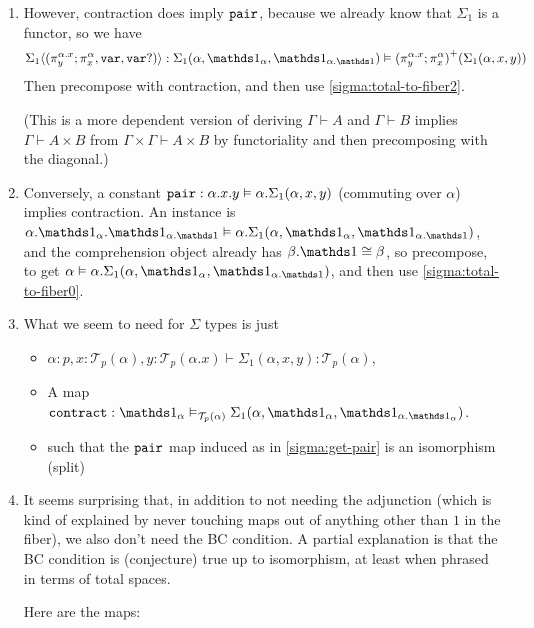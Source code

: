 \documentclass[10pt]{article}
\theoremstyle{definition}
\newcommand\TrPlus[2]{\ensuremath{{#1}^+(#2)}}
\newcommand\El[2]{\mathcal{T}_{#1}(#2)}
\newcommand\ap[2]{\ensuremath{#1 \langle #2 \rangle }}
\begin{document}
\begin{enumerate}
\item \label{sigma:get-pair} However, contraction does imply
  $\mathtt{pair}$, because we already know that $\Sigma_1$ is a functor, so
  we have
  \[
  \ap{\Sigma_1}{(\pi^{\alpha.x}_y;\pi^\alpha_x, \mtt{var}, \mtt{var}?)} :
  \Sigma_1(\alpha,\One_\alpha,\One_{\alpha.\One}) \vDash \TrPlus{(\pi^{\alpha.x}_y;\pi^\alpha_x)}{\Sigma_1(\alpha,x,y)}
  \]
  Then precompose with contraction, and then use
  \ref{sigma:total-to-fiber2}.

  (This is a more dependent version of deriving $\Gamma \vdash A$ and
  $\Gamma \vdash B$ implies $\Gamma \vdash A \times B$ from $\Gamma
  \times \Gamma \vdash A \times B$ by functoriality and then
  precomposing with the diagonal.)
  
\item Conversely, a constant $\mathtt{pair} : \alpha.x.y \vDash
  \alpha.\Sigma_1(\alpha,x,y)$ (commuting over $\alpha$) implies
  contraction. An instance is $\alpha.\One_{\alpha}.\One_{\alpha.\One} \vDash
  \alpha.\Sigma_1(\alpha,\One_\alpha,\One_{\alpha.\One})$, and the comprehension
  object already has $\beta.\One \cong \beta$, so precompose, to get
  $\alpha \vDash \alpha.\Sigma_1(\alpha,\One_\alpha,\One_{\alpha.\One})$, and
  then use \ref{sigma:total-to-fiber0}.

\item \label{sigma:spec} What we seem to need for $\Sigma$ types is just
  \begin{itemize}
  \item $\alpha : p, x : \El{p}{\alpha}, y : \El{p}{\alpha.x} \vdash \Sigma_1(\alpha,x,y) : \El{p}{\alpha}$,
  \item A map $\mtt{contract} : \One_\alpha \vDash_{\El{p}{\alpha}} \Sigma_1(\alpha,\One_\alpha,\One_{\alpha.{\One_\alpha}})$.
  \item such that the $\mathtt{pair}$ map induced as in
    \ref{sigma:get-pair} is an isomorphism (split)
  \end{itemize}

\item It seems surprising that, in addition to not needing the
  adjunction (which is kind of explained by never touching maps out of
  anything other than $1$ in the fiber), we also don't need the BC
  condition.  A partial explanation is that the BC condition is
  (conjecture) true up to isomorphism, at least when phrased in terms of
  total spaces.

  Here are the maps:


\end{enumerate}
\end{document}
